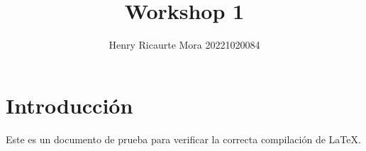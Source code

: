 \documentclass{article}
\title{Workshop 1}
\author{Henry Ricaurte Mora 20221020084}
\date{}
\begin{document}
\maketitle

\section{Introducción}
Este es un documento de prueba para verificar la correcta compilación de LaTeX.
\end{document}
